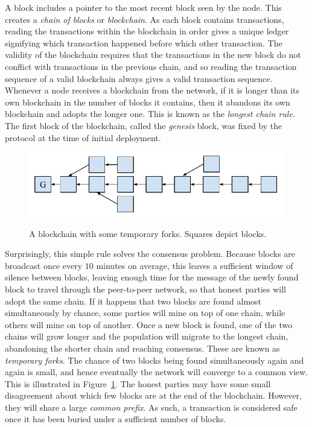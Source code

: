 A block includes a pointer to the most recent block seen by the node. This
creates a \emph{chain of blocks} or \emph{blockchain}. As each block contains
transactions, reading the transactions within the blockchain in order gives a
unique ledger signifying which transaction happened before which other
transaction. The validity of the blockchain requires that the transactions in
the new block do not conflict with transactions in the previous chain, and so
reading the transaction sequence of a valid blockchain always gives a valid
transaction sequence. Whenever a node receives a blockchain from the
network, if it is longer than its own blockchain in the number of blocks it
contains, then it abandons its own blockchain and adopts the longer one. This is
known as the \emph{longest chain rule}. The first block of the blockchain,
called the \emph{genesis} block, was fixed by the protocol at the time of
initial deployment.

\begin{figure}[h]
    \caption{
    A blockchain with some temporary forks. Squares depict blocks.
    }
    \centering
    \includegraphics[width=0.7\columnwidth,keepaspectratio]{chapters/introduction/figures/blockchain.pdf}
    \label{fig.blockchain}
\end{figure}

Surprisingly, this simple rule solves the consensus problem. Because blocks are
broadcast once every $10$ minutes on average, this leaves a sufficient window of
silence between blocks, leaving enough time for the message of the newly found
block to travel through the peer-to-peer network, so that honest parties will adopt the same chain. If it
happens that two blocks are found almost simultaneously by chance, some parties
will mine on top of one chain, while others will mine on top of another. Once a
new block is found, one of the two chains will grow longer and the population
will migrate to the longest chain, abandoning the shorter chain and reaching
consensus. These are known as \emph{temporary forks}. The
chance of two blocks being found simultaneously again and again is small, and
hence eventually the network will converge to a common view. This is illustrated
in Figure~\ref{fig.blockchain}. The honest parties may have some small
disagreement about which few blocks are at the end of the blockchain. However,
they will share a large \emph{common prefix}. As such, a transaction is
considered safe once it has been buried under a sufficient number of blocks.

